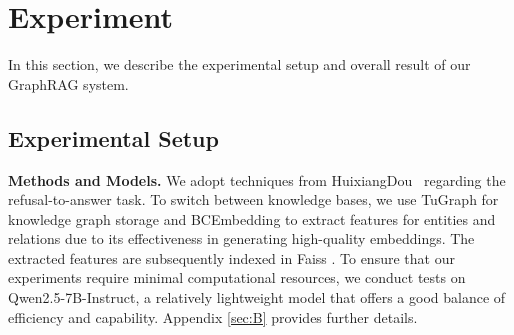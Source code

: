 \documentclass[11pt]{article}
\begin{document}
\section{Experiment}
In this section, we describe the experimental setup and overall result of our GraphRAG system.

\subsection{Experimental Setup}
\noindent\textbf{Methods and Models.} We adopt techniques from HuixiangDou~\cite{kong2024huixiangdou} regarding the refusal-to-answer task. To switch between knowledge bases, we use TuGraph \cite{TuGraph} for knowledge graph storage and BCEmbedding \cite{youdao_bcembedding_2023} to extract features for entities and relations due to its effectiveness in generating high-quality embeddings. 
The extracted features are subsequently indexed in Faiss \cite{douze2024faisslibrary}.
To ensure that our experiments require minimal computational resources, we conduct tests on Qwen2.5-7B-Instruct, a relatively lightweight model that offers a good balance of efficiency and capability. Appendix \ref{sec:B} provides further details.
\end{document}
